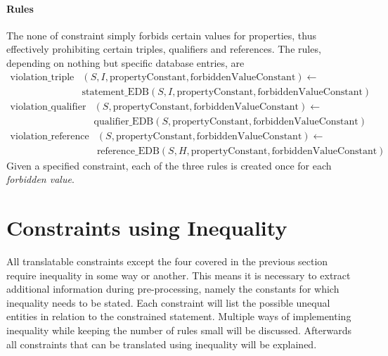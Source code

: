 \documentclass[hyperref,bachelorofscience,fleqn]{cgvpub}
\begin{document}
\paragraph{Rules}
The none of constraint simply forbids certain values for properties, thus effectively prohibiting certain triples, qualifiers and references. The rules, depending on nothing but specific database entries, are
\begin{equation*}
\begin{split}
\text{violation\_triple}&(S, I, \text{propertyConstant}, \text{forbiddenValueConstant}) \leftarrow \\
&\text{statement\_EDB}(S, I, \text{propertyConstant}, \text{forbiddenValueConstant})
\end{split}
\end{equation*}
\begin{equation*}
\begin{split}
\text{violation\_qualifier}&(S, \text{propertyConstant}, \text{forbiddenValueConstant}) \leftarrow \\
&\text{qualifier\_EDB}(S, \text{propertyConstant}, \text{forbiddenValueConstant})
\end{split}
\end{equation*}
\begin{equation*}
\begin{split}
\text{violation\_reference}&(S, \text{propertyConstant}, \text{forbiddenValueConstant}) \leftarrow \\
&\text{reference\_EDB}(S, H, \text{propertyConstant}, \text{forbiddenValueConstant})
\end{split}
\end{equation*}
Given a specified constraint, each of the three rules is created once for each \emph{forbidden value}.

\section{Constraints using Inequality}\label{sec_constraints_using_inequality}
All translatable constraints except the four covered in the previous section require inequality in some way or another. This means it is necessary to extract additional information during pre-processing, namely the constants for which inequality needs to be stated. Each constraint will list the possible unequal entities in relation to the constrained statement. Multiple ways of implementing inequality while keeping the number of rules small will be discussed. Afterwards all constraints that can be translated using inequality will be explained.
\end{document}
